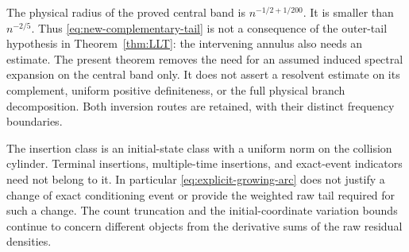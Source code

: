 \begin{remark}
\label{rem:growing-arc-boundary}
The physical radius of the proved central band is
$n^{-1/2+1/200}$. It is smaller than $n^{-2/5}$. Thus
\eqref{eq:new-complementary-tail} is not a consequence of the outer-tail
hypothesis in Theorem~\ref{thm:LLT}: the intervening annulus also needs
an estimate. The present theorem removes the need for an assumed induced
spectral expansion on the central band only. It does not assert a
resolvent estimate on its complement, uniform positive definiteness,
or the full physical branch decomposition. Both inversion routes are
retained, with their distinct frequency boundaries.

The insertion class is an initial-state class with a uniform norm on
the collision cylinder. Terminal insertions, multiple-time insertions,
and exact-event indicators need not belong to it. In particular
\eqref{eq:explicit-growing-arc} does not justify a change of exact
conditioning event or provide the weighted raw tail required for such
a change. The count truncation and the initial-coordinate variation
bounds continue to concern different objects from the derivative sums
of the raw residual densities.
\end{remark}
